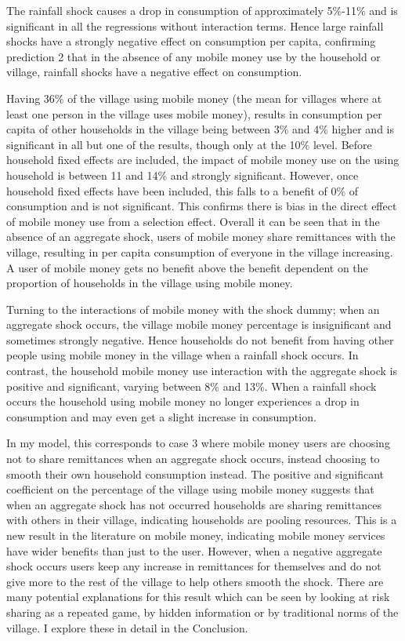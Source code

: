 The rainfall shock causes a drop in consumption of approximately 5\%-11\% and is  significant in all the regressions without interaction terms. Hence large rainfall shocks have a strongly negative effect on consumption per capita, confirming prediction 2 that in the absence of any mobile money use by the household or village, rainfall shocks have a negative effect on consumption.  

Having 36\% of the village using mobile money (the mean for villages where at least one person in the village uses mobile money), results in consumption per capita of other households in the village being between 3\% and 4\% higher and is  significant in all but one of the results, though only at the 10\% level. Before household fixed effects are included, the impact of mobile money use on the using household is between 11 and 14\% and strongly significant. However, once household fixed effects have been included, this falls to a benefit of 0\% of consumption and is not significant. This confirms there is bias in the direct effect of mobile money use from a selection effect. Overall it can be seen that in the absence of an aggregate shock, users of mobile money share remittances with the village, resulting in per capita consumption of everyone in the village increasing. A user of mobile money gets no benefit above the benefit dependent on the proportion of households in the village using mobile money. 

Turning to the interactions of mobile money with the shock dummy; when an aggregate shock occurs, the village mobile money percentage is insignificant and sometimes strongly negative. Hence households do not benefit from having other people using mobile money in the village when a rainfall shock occurs. In contrast, the household mobile money use interaction with the aggregate shock is positive and significant, varying between 8\% and 13\%. When a rainfall shock occurs the household using mobile money no longer experiences a drop in consumption and may even get a slight increase in consumption.  

In my model, this corresponds to case 3 where mobile money users are choosing not to share remittances when an aggregate shock occurs, instead choosing to smooth their own household consumption instead. The positive and significant coefficient on the percentage of the village using mobile money suggests that when an aggregate shock has not occurred households are sharing remittances with others in their village, indicating households are pooling resources. This is a new result in the literature on mobile money, indicating mobile money services have wider benefits than just to the user. However, when a negative aggregate shock occurs users keep any increase in remittances for themselves and do not give more to the rest of the village to help others smooth the shock. There are many potential explanations for this result which can be seen by looking at risk sharing as a repeated game, by hidden information or by traditional norms of the village. I explore these in detail in the Conclusion.   

